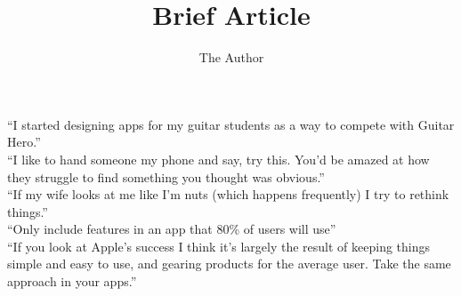 \documentclass[36pt]{amsart}
\title{Brief Article}
\author{The Author}
\begin{document}
\maketitle



{\Huge``I started designing apps for my guitar students as a way to compete with Guitar Hero.''}\\

{\Huge``I like to hand someone my phone and say, try this. You'd be amazed at how they struggle to find 
something you thought was obvious.''}\\

{\Huge``If my wife looks at me like I'm nuts (which happens frequently) I try to rethink things.''}\\

{\Huge``Only include features in an app that 80\% of users will use''}\\

{\Huge``If you look at Apple's success I think it's largely the result of keeping things simple and easy to use, and gearing products for the average user. Take the same approach in your apps.''}\\
\end{document}
